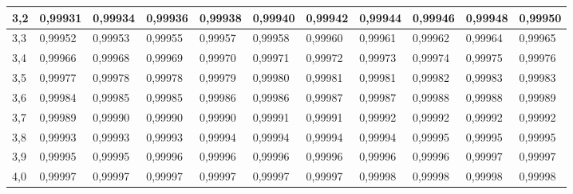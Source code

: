 \documentclass[12pt,a4paper,twocolumn]{article}
\begin{document}
\begin{tabular}{l|l|l|l|l|l|l|l|l|l|l}
3,2 & 0,99931 & 0,99934 & 0,99936 & 0,99938 & 0,99940 & 0,99942 & 0,99944 & 0,99946 & 0,99948 & 0,99950\\ \hline
3,3 & 0,99952 & 0,99953 & 0,99955 & 0,99957 & 0,99958 & 0,99960 & 0,99961 & 0,99962 & 0,99964 & 0,99965\\ \hline
3,4 & 0,99966 & 0,99968 & 0,99969 & 0,99970 & 0,99971 & 0,99972 & 0,99973 & 0,99974 & 0,99975 & 0,99976\\ \hline
3,5 & 0,99977 & 0,99978 & 0,99978 & 0,99979 & 0,99980 & 0,99981 & 0,99981 & 0,99982 & 0,99983 & 0,99983\\ \hline
3,6 & 0,99984 & 0,99985 & 0,99985 & 0,99986 & 0,99986 & 0,99987 & 0,99987 & 0,99988 & 0,99988 & 0,99989\\ \hline
3,7 & 0,99989 & 0,99990 & 0,99990 & 0,99990 & 0,99991 & 0,99991 & 0,99992 & 0,99992 & 0,99992 & 0,99992\\ \hline
3,8 & 0,99993 & 0,99993 & 0,99993 & 0,99994 & 0,99994 & 0,99994 & 0,99994 & 0,99995 & 0,99995 & 0,99995\\ \hline
3,9 & 0,99995 & 0,99995 & 0,99996 & 0,99996 & 0,99996 & 0,99996 & 0,99996 & 0,99996 & 0,99997 & 0,99997\\ \hline
4,0 & 0,99997 & 0,99997 & 0,99997 & 0,99997 & 0,99997 & 0,99997 & 0,99998 & 0,99998 & 0,99998 & 0,99998

\end{tabular}
\end{document}
